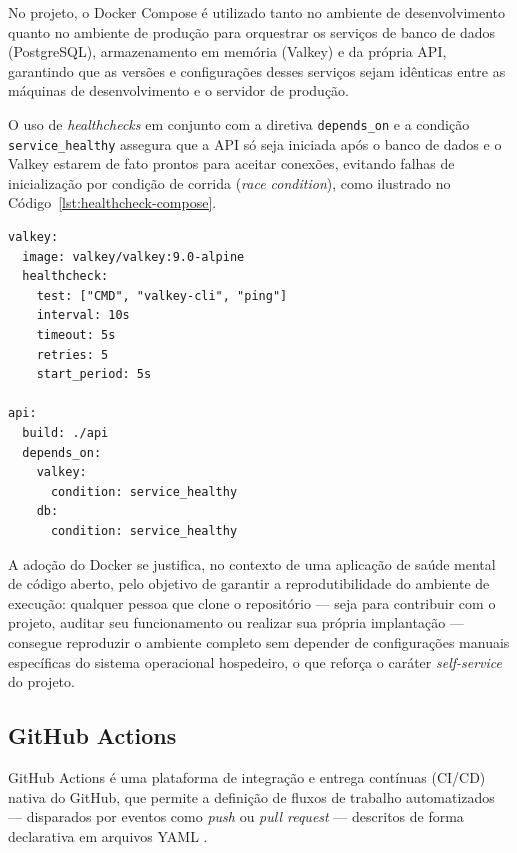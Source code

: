 No projeto, o Docker Compose é utilizado tanto no ambiente de desenvolvimento
quanto no ambiente de produção para orquestrar os serviços de banco de dados
(PostgreSQL), armazenamento em memória (Valkey) e da própria API, garantindo
que as versões e configurações desses serviços sejam idênticas entre as
máquinas de desenvolvimento e o servidor de produção.

O uso de \textit{healthchecks} em conjunto com a diretiva
\texttt{depends\_on} e a condição \texttt{service\_healthy} assegura
que a API só seja iniciada após o banco de dados e o Valkey estarem de
fato prontos para aceitar conexões, evitando falhas de inicialização
por condição de corrida (\textit{race condition}), como ilustrado no
Código~\ref{lst:healthcheck-compose}.

\begin{lstlisting}[caption={Configuração do \textit{healthcheck} do Valkey e de dependência condicional da API no \texttt{docker-compose.yml}}, label={lst:healthcheck-compose}]
valkey:
  image: valkey/valkey:9.0-alpine
  healthcheck:
    test: ["CMD", "valkey-cli", "ping"]
    interval: 10s
    timeout: 5s
    retries: 5
    start_period: 5s

api:
  build: ./api
  depends_on:
    valkey:
      condition: service_healthy
    db:
      condition: service_healthy
\end{lstlisting}


A adoção do Docker se justifica, no contexto de uma aplicação de saúde
mental de código aberto, pelo objetivo de garantir a reprodutibilidade do
ambiente de execução: qualquer pessoa que clone o repositório --- seja para
contribuir com o projeto, auditar seu funcionamento ou realizar sua própria
implantação --- consegue reproduzir o ambiente completo sem depender de
configurações manuais específicas do sistema operacional hospedeiro, o que
reforça o caráter \textit{self-service} do projeto.

\subsection{GitHub Actions}

GitHub Actions é uma plataforma de integração e entrega contínuas (CI/CD)
nativa do GitHub, que permite a definição de fluxos de trabalho automatizados
--- disparados por eventos como \textit{push} ou \textit{pull request} ---
descritos de forma declarativa em arquivos YAML \citep{githubactions:2026}.

